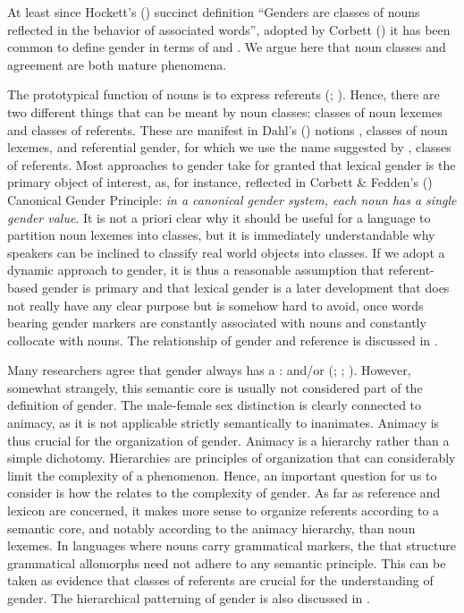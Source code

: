 \documentclass[output=collectionpaper]{langsci/langscibook}
\begin{document}
At least since Hockett's (\citealt*[231]{Hockett1958}) succinct definition \textendash{} ``Genders are classes of nouns reflected in the behavior of associated words'', adopted by Corbett (\citealt*{Corbett1991}) \textendash{} it has been common to define gender in terms of  and . We argue here that noun classes and agreement are both mature phenomena.

The prototypical function of nouns is to express referents (\citealt[438]{Croft2005}; \citealt{Baker2003}). Hence, there are two different things that can be meant by noun classes: classes of noun lexemes and classes of referents. These are manifest in Dahl's (\citealt*[107]{Dahl2000a}) notions , classes of noun lexemes, and referential gender, for which we use the name  suggested by , classes of referents. Most approaches to gender take for granted that lexical gender is the primary object of interest, as, for instance, reflected in Corbett \& Fedden's (\citealt*[9]{Corbett2016}) Canonical Gender Principle: \emph{in a canonical gender system, each noun has a single gender value}. It is not a priori clear why it should be useful for a language to partition noun lexemes into classes, but it is immediately understandable why speakers can be inclined to classify real world objects into classes. If we adopt a dynamic approach to gender, it is thus a reasonable assumption that referent-based gender is primary and that lexical gender is a later development that does not really have any clear purpose but is somehow hard to avoid, once words bearing gender markers are constantly associated with nouns and constantly collocate with nouns. The relationship of gender and reference is discussed in .

Many researchers agree that gender always has a :  and/or  (\citealt[101]{Dahl2000a}; \citealt[68]{Corbett1991}; \citealt{Luraghi2011}). However, somewhat strangely, this semantic core is usually not considered part of the definition of gender. The male-female sex distinction is clearly connected to animacy, as it is not applicable strictly semantically to inanimates. Animacy is thus crucial for the organization of gender. Animacy is a hierarchy rather than a simple dichotomy. Hierarchies are principles of organization that can considerably limit the complexity of a phenomenon. Hence, an important question for us to consider is how the  relates to the complexity of gender. As far as reference and lexicon are concerned, it makes more sense to organize referents according to a semantic core, and notably according to the animacy hierarchy, than noun lexemes. In languages where nouns carry grammatical markers, the  that structure grammatical allomorphs need not adhere to any semantic principle. This can be taken as evidence that classes of referents are crucial for the understanding of gender. The hierarchical patterning of gender is also discussed in .
\end{document}

